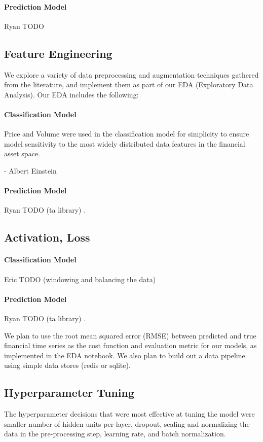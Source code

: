 \documentclass{article}
\begin{document}
\begin{multicols}{2}
\paragraph{Prediction Model}
Ryan TODO


\subsection{Feature Engineering}
We explore a variety of data preprocessing and augmentation techniques gathered from the literature, and implement them as part of our EDA (Exploratory Data Analysis). Our EDA includes the following:
\paragraph{Classification Model}
Price and Volume were used in the classification model for simplicity to ensure model sensitivity to the most widely distributed data features in the financial asset space.

 - Albert Einstein

\paragraph{Prediction Model}
Ryan TODO (ta library) \cite{3_website}.


\subsection{Activation, Loss}
\paragraph{Classification Model}
Eric TODO (windowing and balancing the data) \cite{4_website}
\paragraph{Prediction Model}
Ryan TODO (ta library) \cite{3_website}.

We plan to use the root mean squared error (RMSE) between predicted and true financial time series as the cost function and evaluation metric for our models, as implemented in the EDA notebook. We also plan to build out a data pipeline using simple data stores (redis or sqlite).


\subsection{Hyperparameter Tuning}
The hyperparameter decisions that were most effective at tuning the model were smaller number of hidden units per layer, dropout, scaling and normalizing the data in the pre-processing step, learning rate, and batch normalization.

\end{multicols}
\end{document}
